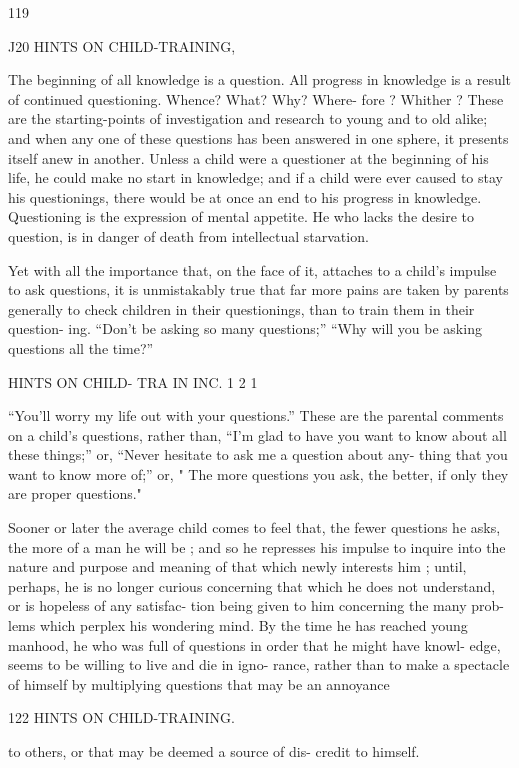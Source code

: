 \documentclass[
]{book}
\begin{document}
119

J20 HINTS ON CHILD-TRAINING,

The beginning of all knowledge is a question. All progress in knowledge is a result of continued questioning. Whence? What? Why? Where- fore ? Whither ? These are the starting-points of investigation and research to young and to old alike; and when any one of these questions has been answered in one sphere, it presents itself anew in another. Unless a child were a questioner at the beginning of his life, he could make no start in knowledge; and if a child were ever caused to stay his questionings, there would be at once an end to his progress in knowledge. Questioning is the expression of mental appetite. He who lacks the desire to question, is in danger of death from intellectual starvation.

Yet with all the importance that, on the face of it, attaches to a child's impulse to ask questions, it is unmistakably true that far more pains are taken by parents generally to check children in their questionings, than to train them in their question- ing. ``Don't be asking so many questions;'' ``Why will you be asking questions all the time?''

HINTS ON CHILD- TRA IN INC. 1 2 1

``You'll worry my life out with your questions.'' These are the parental comments on a child's questions, rather than, ``I'm glad to have you want to know about all these things;'' or, ``Never hesitate to ask me a question about any- thing that you want to know more of;'' or, " The more questions you ask, the better, if only they are proper questions."

Sooner or later the average child comes to feel that, the fewer questions he asks, the more of a man he will be ; and so he represses his impulse to inquire into the nature and purpose and meaning of that which newly interests him ; until, perhaps, he is no longer curious concerning that which he does not understand, or is hopeless of any satisfac- tion being given to him concerning the many prob- lems which perplex his wondering mind. By the time he has reached young manhood, he who was full of questions in order that he might have knowl- edge, seems to be willing to live and die in igno- rance, rather than to make a spectacle of himself by multiplying questions that may be an annoyance

122 HINTS ON CHILD-TRAINING.

to others, or that may be deemed a source of dis- credit to himself.
\end{document}
